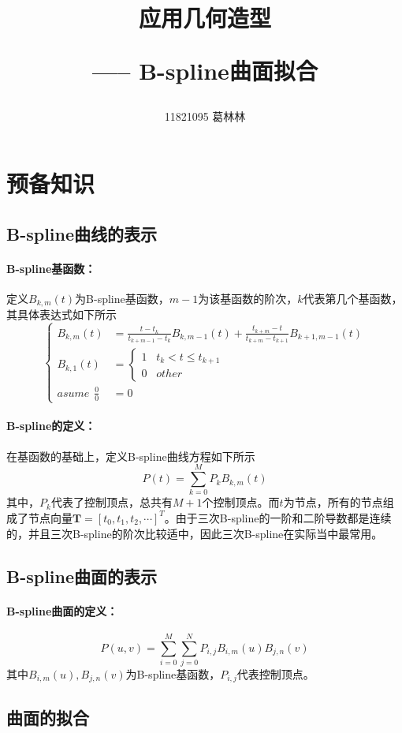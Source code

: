 \documentclass[10pt]{article}
\title{应用几何造型 \hspace{2pt}\hspace{2pt} \begin{large}----- \hspace{2pt} B-spline曲面拟合 \end{large} }
\author{11821095 葛林林}
\begin{document}
\maketitle


\section{预备知识}
\subsection{B-spline曲线的表示}
\paragraph{B-spline基函数：}
定义$B_{k,m}(t)$为B-spline基函数，$m-1$为该基函数的阶次，$k$代表第几个基函数，其具体表达式如下所示
$$
\left\{
\begin{array}{rl}
B_{k,m}(t)&=\frac{t-t_k}{t_{k+m-1}-t_k}B_{k,m-1}(t)+\frac{t_{k+m}-t}{t_{k+m}-t_{k+1}}B_{k+1,m-1}(t)\\
B_{k,1}(t)&=
\left\{
\begin{array}{l}
1 \hspace{10pt} t_k<t \leq t_{k+1} \\
0 \hspace{10pt} other
\end{array}
\right.\\
asume \hspace{5pt} \frac{0}{0}&=0
\end{array}
\right. 
$$
\paragraph{B-spline的定义：}在基函数的基础上，定义B-spline曲线方程如下所示
$$P(t)=\sum_{k=0}^{M}P_kB_{k,m}(t)$$
其中，$P_k$代表了控制顶点，总共有$M+1$个控制顶点。而$t$为节点，所有的节点组成了节点向量$\bm{T}=[t_0,t_1,t_2,\cdots]^T$。由于三次B-spline的一阶和二阶导数都是连续的，并且三次B-spline的阶次比较适中，因此三次B-spline在实际当中最常用。

\subsection{B-spline曲面的表示}
\paragraph{B-spline曲面的定义：}
$$P(u,v)=\sum_{i=0}^{M}\sum_{j=0}^{N}P_{i,j}B_{i,m}(u)B_{j,n}(v)$$
其中$B_{i,m}(u),B_{j,n}(v)$为B-spline基函数，$P_{i,j}$代表控制顶点。
\subsection{曲面的拟合}
\end{document}
